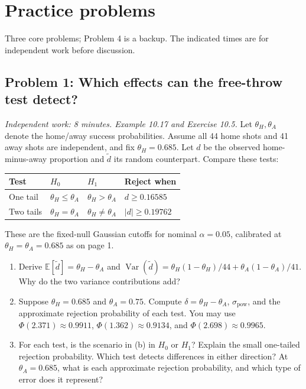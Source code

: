 \documentclass[11pt]{article}
\newcommand{\rv}[1]{\widetilde{#1}}
\newcommand{\E}{\mathbb E}
\newcommand{\Var}{\operatorname{Var}}
\newcommand{\workingspace}[1]{}
\newcommand{\workingspace}[1]{\vspace{#1}}
\begin{document}
\newpage
\section*{Practice problems}
\noindent Three core problems; Problem 4 is a backup. The indicated times
are for independent work before discussion.

\subsection*{Problem 1: Which effects can the free-throw test detect?}
\noindent\textit{Independent work: 8 minutes. Example 10.17 and Exercise 10.5.}
Let $\theta_H,\theta_A$ denote the home/away success probabilities.
Assume all 44 home shots and 41 away shots are independent, and fix
$\theta_H=0.685$. Let $d$ be the observed home-minus-away proportion
and $\rv d$ its random counterpart. Compare these tests:
\begin{center}
\begin{tabular}{@{}llll@{}}
\toprule Test & $H_0$ & $H_1$ & Reject when\\\midrule
One tail & $\theta_H\leq\theta_A$ & $\theta_H>\theta_A$ & $d\geq0.16585$\\
Two tails & $\theta_H=\theta_A$ & $\theta_H\ne\theta_A$ & $|d|\geq0.19762$\\
\bottomrule
\end{tabular}
\end{center}
These are the fixed-null Gaussian cutoffs for nominal $\alpha=0.05$,
calibrated at $\theta_H=\theta_A=0.685$ as on page 1.
\begin{enumerate}
 \item Derive $\E[\rv d]=\theta_H-\theta_A$ and
 $\Var(\rv d)=\theta_H(1-\theta_H)/44+\theta_A(1-\theta_A)/41$.
 Why do the two variance contributions add?
 \item Suppose $\theta_H=0.685$ and $\theta_A=0.75$.
 Compute $\delta=\theta_H-\theta_A$, $\sigma_{\mathrm{pow}}$, and
 the approximate rejection probability of each test.
 You may use $\Phi(2.371)\approx0.9911$,
 $\Phi(1.362)\approx0.9134$, and $\Phi(2.698)\approx0.9965$.
 \item For each test, is the scenario in (b) in $H_0$ or $H_1$?
 Explain the small one-tailed rejection probability. Which test detects
 differences in either direction? At $\theta_A=0.685$, what is each
 approximate rejection probability, and which type of error does it represent?
\end{enumerate}
\workingspace{9cm}
\end{document}
